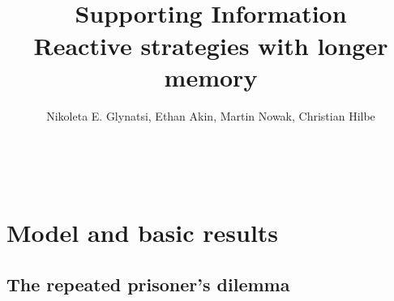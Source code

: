 \documentclass[11pt]{article}
\title{~\\[-1.5cm]{\sffamily \Large Supporting Information}\\ {\bfseries \sffamily \LARGE Reactive strategies with longer memory}\\[-0.3cm]}
\author{Nikoleta E. Glynatsi, Ethan Akin, Martin Nowak, Christian Hilbe}
\date{\empty}
\theoremstyle{plainCl1}
\theoremstyle{plainCl2}
\begin{document}
\maketitle


\noindent

~\\[-1.2cm]
\section{Model and basic results}\label{section:model}

\subsection{The repeated prisoner's dilemma}

\end{document}

